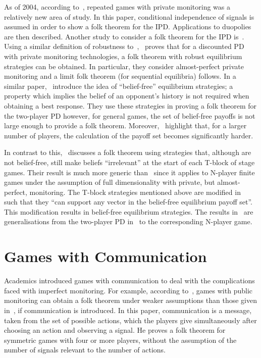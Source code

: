 As of 2004, according to~\cite{Matsushima2004}, repeated games with private
monitoring was a relatively new area of study. In this paper, conditional
independence of signals
is assumed in order to show a folk theorem for the IPD\@. Applications to
duopolies are then described. Another study to consider a folk theorem for the
IPD is~\cite{Ely2002}. Using a similar definition of robustness
to~\cite{Chassang2011},~\cite{Ely2002} proves that for a discounted PD with private monitoring technologies, a folk theorem with robust
equilibrium strategies can be obtained. In particular, they consider
almost-perfect private monitoring and a limit folk theorem (for sequential
equilibria) follows. In a similar paper,~\cite{Ely2005} introduce the idea of
``belief-free'' equilibrium strategies; a property which implies the belief of
an opponent's history is not required when obtaining a best response. They use
these strategies in proving a folk theorem for the two-player PD
however, for general games, the set of belief-free payoffs is not large enough
to provide a folk theorem. Moreover,~\cite{Ely2005} highlight that, for a larger
number of players, the calculation of the payoff set becomes significantly
harder.

In contrast to this,~\cite{Hoerner2006} discusses a folk theorem using
strategies that, although are not belief-free, still make beliefs ``irrelevant''
at the start of each T-block of stage games. Their result is much more generic
than~\cite{Ely2005} since it applies to N-player finite games under the
assumption of full dimensionality with private, but almost-perfect, monitoring.
The T-block strategies mentioned above are modified in~\cite{Yamamoto2009,Yamamoto2012} such that they ``can support any vector in the belief-free
equilibrium payoff set''. This modification results in belief-free equilibrium
strategies. The results in~\cite{Yamamoto2009,Yamamoto2012} are generalisations
from the two-player PD in~\cite{Ely2005} to the corresponding
N-player game.


\section{Games with Communication}\label{sec:Games_with_Communication} 
Academics introduced games with communication to deal with the complications
faced with imperfect monitoring. For example, according to~\cite{Kandori2003},
games with public monitoring can obtain a folk theorem under weaker assumptions
than those given in~\cite{Fudenberg_1994}, if communication is introduced.
In this paper, communication is a message, taken from the set of possible
actions, which the players give simultaneously after choosing an action and
observing a signal. He proves a folk theorem for symmetric games
with four or more players, without the assumption of the number of signals
relevant to the number of actions.

